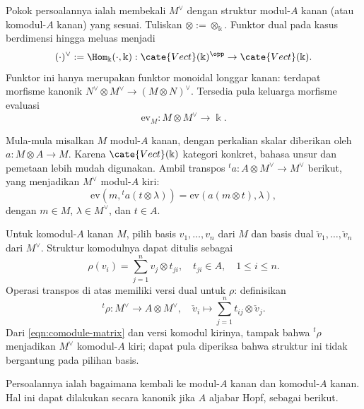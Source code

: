 Pokok persoalannya ialah membekali $M^\vee$ dengan struktur modul-$A$ kanan (atau
komodul-$A$ kanan) yang sesuai. Tuliskan $\otimes:=\otimes_{\Bbbk}$.
Funktor dual pada kasus berdimensi hingga meluas menjadi
\[ (\cdot)^\vee := \Hom_{\Bbbk}(\cdot, \Bbbk): \cate{Vect}(\Bbbk)^{\opp} \to \cate{Vect}(\Bbbk). \]
Funktor ini hanya merupakan funktor monoidal longgar kanan: terdapat morfisme kanonik
$N^\vee\otimes M^\vee\to(M\otimes N)^\vee$. Tersedia pula
keluarga morfisme evaluasi
\[ \mathrm{ev}_M: M \otimes M^\vee \to \Bbbk. \]

Mula-mula misalkan $M$ modul-$A$ kanan, dengan perkalian skalar diberikan
oleh $a:M\otimes A\to M$. Karena $\cate{Vect}(\Bbbk)$ kategori konkret,
bahasa unsur dan pemetaan lebih mudah digunakan. Ambil transpos
${}^ta:A\otimes M^\vee\to M^\vee$ berikut, yang menjadikan $M^\vee$
modul-$A$ kiri:
\[ \mathrm{ev}\left(m, {}^t a(t \otimes \lambda)\right) = \mathrm{ev}\left( a(m \otimes t), \lambda \right), \]
dengan $m\in M$, $\lambda\in M^\vee$, dan $t\in A$.

Untuk komodul-$A$ kanan $M$, pilih basis $v_1,\ldots,v_n$ dari $M$ dan
basis dual $\check v_1,\ldots,\check v_n$ dari $M^\vee$. Struktur
komodulnya dapat ditulis sebagai
\begin{equation}\label{eqn:comodule-basis}
	\rho(v_i) = \sum_{j=1}^n v_j \otimes t_{ji}, \quad t_{ji} \in A, \quad 1 \leq i \leq n.
\end{equation}
Operasi transpos di atas memiliki versi dual untuk $\rho$: definisikan
\[ {}^t \rho: M^\vee \to A \otimes M^\vee, \quad \check{v}_i \mapsto \sum_{j=1}^n t_{ij} \otimes \check{v}_j. \]
Dari \eqref{eqn:comodule-matrix} dan versi komodul kirinya, tampak bahwa
${}^t\rho$ menjadikan $M^\vee$ komodul-$A$ kiri; dapat pula diperiksa
bahwa struktur ini tidak bergantung pada pilihan basis.

Persoalannya ialah bagaimana kembali ke modul-$A$ kanan dan komodul-$A$
kanan. Hal ini dapat dilakukan secara kanonik jika $A$ aljabar Hopf,
sebagai berikut.

